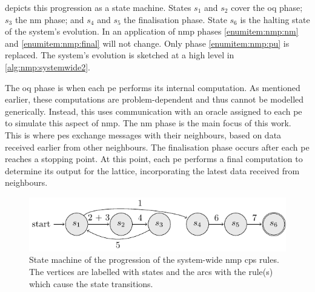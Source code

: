  depicts this progression as a state machine.  States \(s_1\) and \(s_2\) cover the \gls{oq} phase; \(s_3\) the \gls{nm} phase; and \(s_4\) and \(s_5\) the finalisation phase.  State \(s_6\) is the halting state of the system's evolution.  In an application of \gls{nmp} phases \ref{enumitem:nmp:nm} and \ref{enumitem:nmp:final} will not change.  Only phase \ref{enumitem:nmp:pu} is replaced.  The system's evolution is sketched at a high level in \cref{alg:nmp:systemwide2}.

The \gls{oq} phase is when each \gls{pe} performs its internal computation. As mentioned earlier, these computations are problem-dependent and thus cannot be modelled generically. Instead, this  uses communication with an oracle assigned to each \gls{pe} to simulate this aspect of \gls{nmp}. The \gls{nm} phase is the main focus of this work. This is where \glspl{pe} exchange messages with their neighbours, based on data received earlier from other neighbours. The finalisation phase occurs after each \gls{pe} reaches a stopping point. At this point, each \gls{pe} performs a final computation to determine its output for the lattice, incorporating the latest data received from neighbours.

\begin{figure}
    \centering
    \includegraphics{chapters/nmp/images/systemwidestatemachine.pdf}
    \caption[State machine of the progression of the system-wide  \gls{cps} rules.]{State machine of the progression of the system-wide \gls{nmp} \gls{cps} rules.  The vertices are labelled with states and the arcs with the rule(s) which cause the state transitions.}
    \label{fig:nmp:systemwidestatemachine}
\end{figure}

